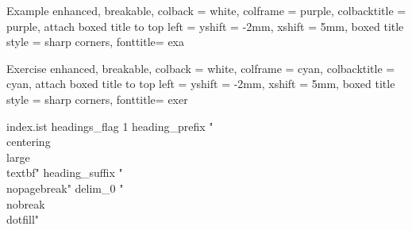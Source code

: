 \makeatletter
\renewcommand\theHtcb@cnt@corollary{\thechapter.\arabic{tcb@cnt@corollary}}
\makeatother


\makeatletter
\renewcommand\theHtcb@cnt@lemma{\thechapter.\arabic{tcb@cnt@lemma}}
\makeatother


{Example}%
  {
    enhanced, breakable,
    colback = white, colframe = purple, colbacktitle = purple,
    attach boxed title to top left = {yshift = -2mm, xshift = 5mm},
    boxed title style = {sharp corners},
    fonttitle=\sffamily\small
  }
{exa}

\makeatletter
\renewcommand\theHtcb@cnt@example{\thechapter.\arabic{tcb@cnt@example}}
\makeatother


{Exercise}%
  {
    enhanced, breakable,
    colback = white, colframe = cyan, colbacktitle = cyan,
    attach boxed title to top left = {yshift = -2mm, xshift = 5mm},
    boxed title style = {sharp corners},
    fonttitle=\sffamily\small
  }
{exer}

\makeatletter
\renewcommand\theHtcb@cnt@exercise{\thechapter.\arabic{tcb@cnt@exercise}}
\makeatother



\usepackage{changepage}
\newenvironment{remark}{\underline{\textbf{Remark.}}}{\par}

\newenvironment{proofsolution}
    {\renewcommand\qedsymbol{$\square$}\color{blue}\begin{adjustwidth}{0em}{2em}\begin{proof}[\textit Proof.~]}
    {\end{proof}\end{adjustwidth}}


\begin{filecontents}{index.ist}
headings_flag 1
heading_prefix "{\\centering\\large \\textbf{"
heading_suffix "}}\\nopagebreak\n"
delim_0 "\\nobreak\\dotfill"
\end{filecontents}
\newcommand{\myindex}[1]{\index{#1} \emph{#1}}
\makeindex[columns=3, intoc, title=Alphabetical Index, options= -s index.ist]

